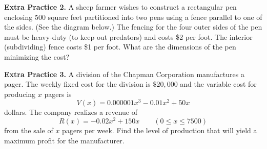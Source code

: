 \documentclass[10pt]{article}
\begin{document}
\newpage%

{\bf\color{blue}Extra Practice 2.} A sheep farmer wishes to construct a rectangular pen enclosing 500 square feet partitioned into two pens using a fence parallel to one of the sides. (See the diagram below.) The fencing for the four outer sides of the pen must be heavy-duty (to keep out predators) and costs \$2 per foot. The interior (subdividing) fence costs \$1 per foot. What are the dimensions of the pen minimizing the cost?\\[0.1in]

\hspace{0.2in}
%
\newpage
{\bf\color{blue}Extra Practice 3.} A division of the Chapman Corporation manufactures  a pager. The weekly fixed cost for the division is $\$20,000$ and the variable cost for producing $x$ pagers is $$V(x)=0.000001x^3-0.01x^2+50x$$ dollars. The company realizes a revenue of $$R(x)=-0.02x^2+150x \qquad (0\leq x \leq 7500)$$ from the sale of $x$ pagers per week. Find the level of production that will yield a maximum profit for the manufacturer.
\end{document}
